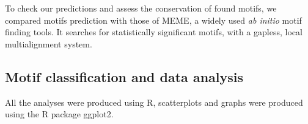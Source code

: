 To check our predictions and assess the conservation of found motifs, we compared motifs prediction with those of MEME, a widely used \textit{ab initio} motif finding tools. It searches for statistically significant motifs, with a gapless, local multialignment system.

\subsection*{Motif classification and data analysis}

All the analyses were produced using R, scatterplots and graphs were produced using the R package ggplot2.

